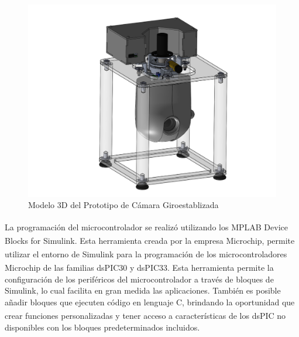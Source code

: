 \begin{figure}[H]
\centering \includegraphics[scale=0.45]{img/Gimbal2.pdf}
\caption{Modelo 3D del Prototipo de C\'{a}mara Giroestablizada}
\label{fig:GimbalModel}
\end{figure}

La programaci\'{o}n del microcontrolador se realiz\'{o} utilizando los MPLAB\textsuperscript{\textregistered} Device Blocks for Simulink\textsuperscript{\textregistered}. Esta herramienta creada por la empresa Microchip\textsuperscript{\textregistered}, permite utilizar el entorno de Simulink\textsuperscript{\textregistered} para la programaci\'{o}n de los microcontroladores Microchip\textsuperscript{\textregistered} de las familias dsPIC\textsuperscript{\textregistered}30 y dsPIC\textsuperscript{\textregistered}33. Esta herramienta permite la configuraci\'{o}n de los perif\'{e}ricos del microcontrolador a trav\'{e}s de bloques de Simulink, lo cual facilita en gran medida las aplicaciones. Tambi\'{e}n es posible a\~{n}adir bloques que ejecuten c\'{o}digo en lenguaje C, brindando la oportunidad que crear funciones personalizadas y tener acceso a caracter\'{i}sticas de los dsPIC\textsuperscript{\textregistered} no disponibles con los bloques predeterminados incluidos.  


